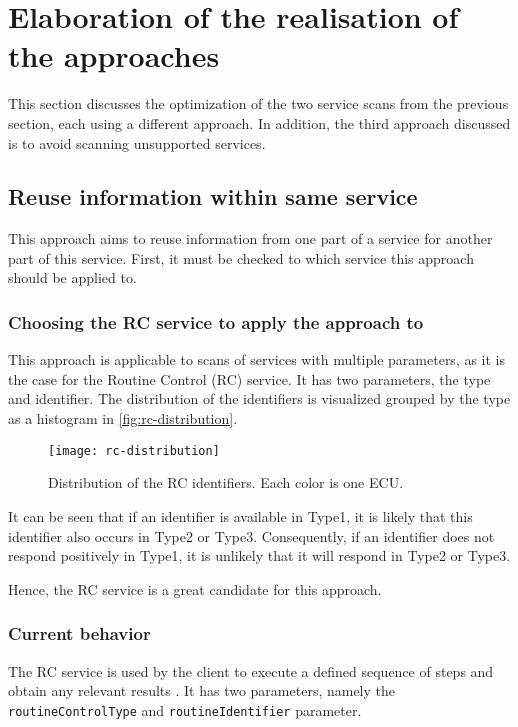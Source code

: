 \section{Elaboration of the realisation of the approaches}

This section discusses the optimization of the two service scans from the previous section, each using a different approach. In addition, the third approach discussed is to avoid scanning unsupported services.

\subsection{Reuse information within same service}

This approach aims to reuse information from one part of a service for another part of this service. First, it must be checked to which service this approach should be applied to.

\subsubsection{Choosing the RC service to apply the approach to}

This approach is applicable to scans of services with multiple parameters, as it is the case for the Routine Control (RC) service. It has two parameters, the type and identifier. The distribution of the identifiers is visualized grouped by the type as a histogram in \autoref{fig:rc-distribution}.

\begin{figure}[h]
    \centering
    \texttt{[image: rc-distribution]}
    \caption{Distribution of the RC identifiers. Each color is one ECU.}
    \label{fig:rc-distribution}
\end{figure}

It can be seen that if an identifier is available in Type1, it is likely that this identifier also occurs in Type2 or Type3. Consequently, if an identifier does not respond positively in Type1, it is unlikely that it will respond in Type2 or Type3.

Hence, the RC service is a great candidate for this approach.

\subsubsection{Current behavior}

The RC service is used by the client to execute a defined sequence of steps and obtain any relevant results \cite{iso14229}. It has two parameters, namely the \texttt{routineControlType} and \texttt{routineIdentifier} parameter.

